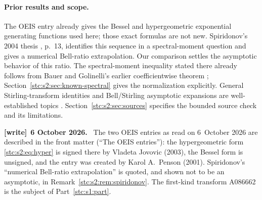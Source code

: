 \documentclass[11pt,letterpaper]{article}
\numberwithin{equation}{section}
\theoremstyle{remark}\newtheorem{remark}[theorem]{Remark}
\newenvironment{writenote}[1][]{\par\smallskip\begingroup\small
 \noindent\textbf{[write]}\if\relax\detokenize{#1}\relax\else~\textbf{#1.}\fi\ }%
 {\par\endgroup\smallskip}
\begin{document}
\paragraph{Prior results and scope.}
The OEIS entry already gives the Bessel and hypergeometric exponential generating functions used here; those exact formulas are not new. Spiridonov's 2004 thesis \cite{spiridonov}, p.~13, identifies this sequence in a spectral-moment question and gives a numerical Bell-ratio extrapolation. Our comparison settles the asymptotic behavior of this ratio. The spectral-moment inequality stated there already follows from Bauer and Golinelli's earlier coefficientwise theorem \cite{bauer}; Section~\ref{stc:s2:sec:known-spectral} gives the normalization explicitly. General Stirling-transform identities and Bell/Stirling asymptotic expansions are well-established topics \cite{rahmani,hwang}. Section~\ref{stc:s2:sec:sources} specifies the bounded source check and its limitations.

\begin{writenote}[6 October 2026]
The two OEIS entries as read on 6~October 2026 are described in the front matter (``The OEIS entries''): the hypergeometric form \eqref{stc:s2:eq:hyper} is signed there by Vladeta Jovovic (2003), the Bessel form is unsigned, and the entry was created by Karol A.~Penson (2001). Spiridonov's ``numerical Bell-ratio extrapolation'' is quoted, and shown not to be an asymptotic, in Remark~\ref{stc:s2:rem:spiridonov}. The first-kind transform A086662 is the subject of Part~\ref{stc:s1:part}.
\end{writenote}
\end{document}
